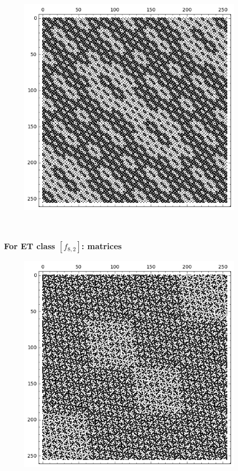\documentclass[pdf,sprung,slideColor,nocolorBG]{beamer}
\newenvironment{colortheme}[1]{
\def\ProvidesPackageRCS $##1${\relax}
\renewcommand{\ProcessOptions}{\relax}
\makeatletter

\makeatother
}{}
\begin{document}
\begin{colortheme}{jubata}
\begin{frame}
\begin{figure}
\begin{minipage}{.48\textwidth}
  \centering
  \includegraphics[width=.9\linewidth]{../matrix_plot/re8_1_bent_cayley_graph_index_matrix.png}
  \label{fig:8_1_bent_cayley_graph_index_matrix}
\end{minipage}
\end{figure}
~
\end{frame}
\begin{frame}
\frametitle{For ET class $[f_{8,2}]$: matrices}
\begin{figure}
\centering
\begin{minipage}{.48\textwidth}
  \centering
  \includegraphics[width=.9\linewidth]{../matrix_plot/re8_2_weight_class_matrix.png}

\end{minipage}
\end{figure}
\end{frame}
\end{colortheme}
\end{document}
